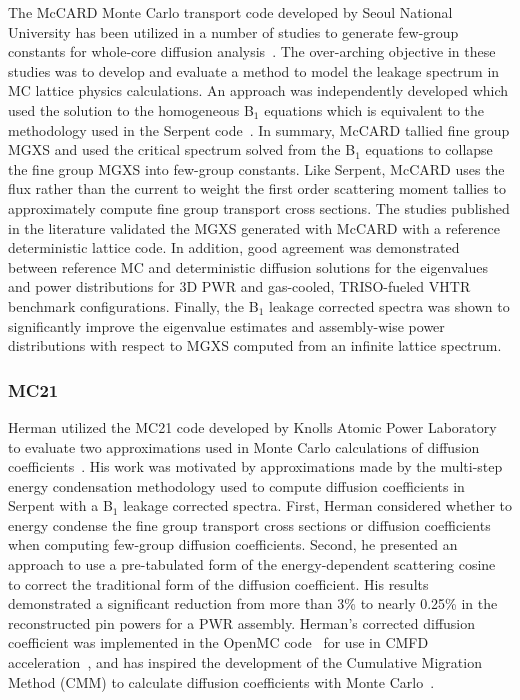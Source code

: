 The McCARD Monte Carlo transport code developed by Seoul National University has been utilized in a number of studies to generate few-group constants for whole-core diffusion analysis~\cite{shim2008generation, park2010assembly, park2012generation}. The over-arching objective in these studies was to develop and evaluate a method to model the leakage spectrum in \ac{MC} lattice physics calculations. An approach was independently developed which used the solution to the homogeneous B$_{1}$ equations which is equivalent to the methodology used in the Serpent code~\cite{fridman2011serpent}. In summary, McCARD tallied fine group \ac{MGXS} and used the critical spectrum solved from the B$_{1}$ equations to collapse the fine group \ac{MGXS} into few-group constants. Like Serpent, McCARD uses the flux rather than the current to weight the first order scattering moment tallies to approximately compute fine group transport cross sections. The studies published in the literature validated the \ac{MGXS} generated with McCARD with a reference deterministic lattice code. In addition, good agreement was demonstrated between reference \ac{MC} and deterministic diffusion solutions for the eigenvalues and power distributions for 3D \ac{PWR} and gas-cooled, TRISO-fueled \ac{VHTR} benchmark configurations. Finally, the B$_{1}$ leakage corrected spectra was shown to significantly improve the eigenvalue estimates and assembly-wise power distributions with respect to \ac{MGXS} computed from an infinite lattice spectrum.

\subsubsection{MC21}
\label{subsec:chap3-lit-review-diffusion-mc21}

Herman utilized the MC21 code developed by Knolls Atomic Power Laboratory to evaluate two approximations used in Monte Carlo calculations of diffusion coefficients~\cite{herman2013improved}. His work was motivated by approximations made by the multi-step energy condensation methodology used to compute diffusion coefficients in Serpent with a B$_{1}$ leakage corrected spectra. First, Herman considered whether to energy condense the fine group transport cross sections or diffusion coefficients when computing few-group diffusion coefficients. Second, he presented an approach to use a pre-tabulated form of the energy-dependent scattering cosine to correct the traditional form of the diffusion coefficient. His results demonstrated a significant reduction from more than 3\% to nearly 0.25\% in the reconstructed pin powers for a \ac{PWR} assembly. Herman's corrected diffusion coefficient was implemented in the OpenMC code~\cite{romano2013openmc} for use in \ac{CMFD} acceleration~\cite{herman2014monte}, and has inspired the development of the Cumulative Migration Method (CMM) to calculate diffusion coefficients with Monte Carlo~\cite{liuphysor2016}.

